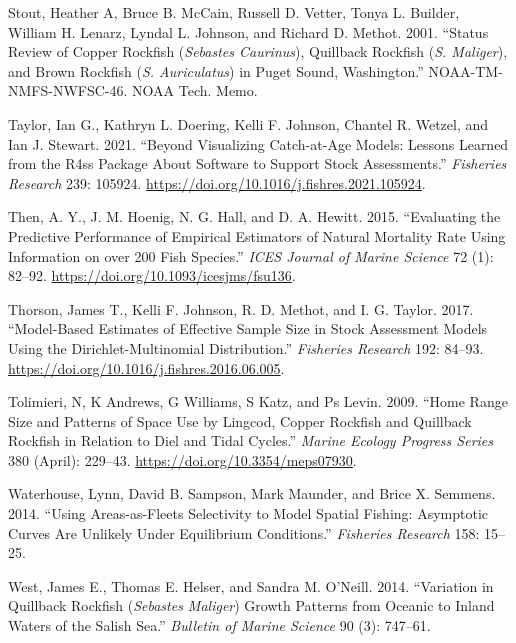\documentclass[11pt,
  english,
  a4paper,
]{article}
\begin{document}
\leavevmode\hypertarget{ref-Stoutetal_DPS_2001}{}%
Stout, Heather A, Bruce B. McCain, Russell D. Vetter, Tonya L. Builder, William H. Lenarz, Lyndal L. Johnson, and Richard D. Methot. 2001. ``Status Review of Copper Rockfish (\emph{Sebastes Caurinus}), Quillback Rockfish (\emph{S. Maliger}), and Brown Rockfish (\emph{S. Auriculatus}) in Puget Sound, Washington.'' NOAA-TM-NMFS-NWFSC-46. NOAA Tech. Memo.

\leavevmode\hypertarget{ref-r4ss_2021}{}%
Taylor, Ian G., Kathryn L. Doering, Kelli F. Johnson, Chantel R. Wetzel, and Ian J. Stewart. 2021. ``Beyond Visualizing Catch-at-Age Models: Lessons Learned from the R4ss Package About Software to Support Stock Assessments.'' \emph{Fisheries Research} 239: 105924. \url{https://doi.org/10.1016/j.fishres.2021.105924}.

\leavevmode\hypertarget{ref-then_evaluating_2015-1}{}%
Then, A. Y., J. M. Hoenig, N. G. Hall, and D. A. Hewitt. 2015. ``Evaluating the Predictive Performance of Empirical Estimators of Natural Mortality Rate Using Information on over 200 Fish Species.'' \emph{ICES Journal of Marine Science} 72 (1): 82--92. \url{https://doi.org/10.1093/icesjms/fsu136}.

\leavevmode\hypertarget{ref-thorson_model-based_2017}{}%
Thorson, James T., Kelli F. Johnson, R. D. Methot, and I. G. Taylor. 2017. ``Model-Based Estimates of Effective Sample Size in Stock Assessment Models Using the Dirichlet-Multinomial Distribution.'' \emph{Fisheries Research} 192: 84--93. \url{https://doi.org/10.1016/j.fishres.2016.06.005}.

\leavevmode\hypertarget{ref-tolimieri_home_2009}{}%
Tolimieri, N, K Andrews, G Williams, S Katz, and Ps Levin. 2009. ``Home Range Size and Patterns of Space Use by Lingcod, Copper Rockfish and Quillback Rockfish in Relation to Diel and Tidal Cycles.'' \emph{Marine Ecology Progress Series} 380 (April): 229--43. \url{https://doi.org/10.3354/meps07930}.

\leavevmode\hypertarget{ref-Waterhouseetal_spatialSelex_2014}{}%
Waterhouse, Lynn, David B. Sampson, Mark Maunder, and Brice X. Semmens. 2014. ``Using Areas-as-Fleets Selectivity to Model Spatial Fishing: Asymptotic Curves Are Unlikely Under Equilibrium Conditions.'' \emph{Fisheries Research} 158: 15--25.

\leavevmode\hypertarget{ref-Westetal_2014}{}%
West, James E., Thomas E. Helser, and Sandra M. O'Neill. 2014. ``Variation in Quillback Rockfish (\emph{Sebastes Maliger}) Growth Patterns from Oceanic to Inland Waters of the Salish Sea.'' \emph{Bulletin of Marine Science} 90 (3): 747--61.
\end{document}

